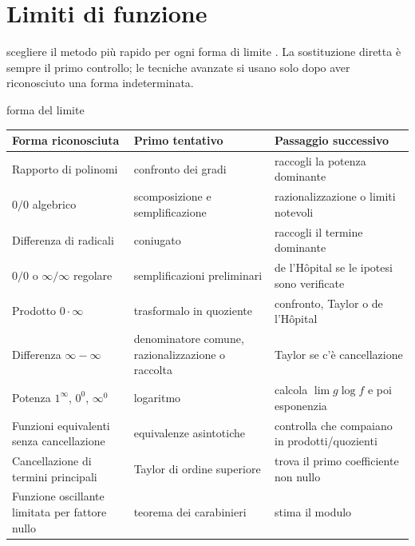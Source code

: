 \chapter{Limiti di funzione}
\label{chap:7}

\begin{obiettivocapitolo}{scegliere il metodo più rapido per ogni forma di limite}
\prioritaalta. La sostituzione diretta è sempre il primo controllo; le tecniche avanzate si usano solo dopo aver riconosciuto una forma indeterminata.
\end{obiettivocapitolo}
\begin{sceltametodo}{forma del limite}
\begin{longtable}{@{}p{}p{}p{}@{}}
\toprule
\textbf{Forma riconosciuta} & \textbf{Primo tentativo} & \textbf{Passaggio successivo}\\
\midrule\endhead
Rapporto di polinomi & confronto dei gradi & raccogli la potenza dominante\\
$0/0$ algebrico & scomposizione e semplificazione & razionalizzazione o limiti notevoli\\
Differenza di radicali & coniugato & raccogli il termine dominante\\
$0/0$ o $\infty/\infty$ regolare & semplificazioni preliminari & de l'Hôpital se le ipotesi sono verificate\\
Prodotto $0\cdot\infty$ & trasformalo in quoziente & confronto, Taylor o de l'Hôpital\\
Differenza $\infty-\infty$ & denominatore comune, razionalizzazione o raccolta & Taylor se c'è cancellazione\\
Potenza $1^\infty$, $0^0$, $\infty^0$ & logaritmo & calcola $\lim g\log f$ e poi esponenzia\\
Funzioni equivalenti senza cancellazione & equivalenze asintotiche & controlla che compaiano in prodotti/quozienti\\
Cancellazione di termini principali & Taylor di ordine superiore & trova il primo coefficiente non nullo\\
Funzione oscillante limitata per fattore nullo & teorema dei carabinieri & stima il modulo\\
\bottomrule
\end{longtable}
\end{sceltametodo}
